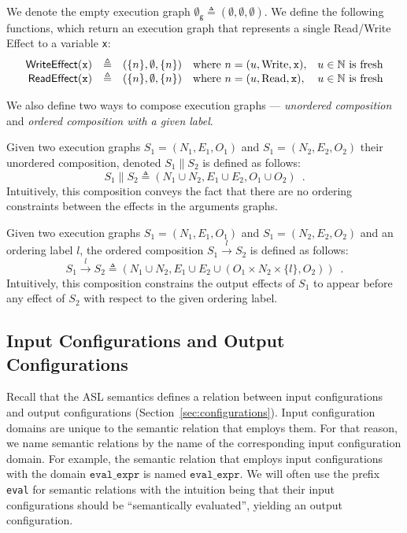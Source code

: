 \documentclass{book}
\newcommand\secref[1]{Section~\ref{sec:#1}}
\newcommand\xgraph[0]{\textsf{g}}
\newcommand\emptygraph[0]{{\emptyset}_\xgraph}
\newcommand\Read[0]{\text{Read}}
\newcommand\Write[0]{\text{Write}}
\newcommand\WriteEffect[0]{\textsf{WriteEffect}}
\newcommand\ReadEffect[0]{\textsf{ReadEffect}}
\newcommand\ordered[3]{{#1}\xrightarrow{#2}{#3}}
\begin{document}
We denote the empty execution graph $\emptygraph \triangleq (\emptyset, \emptyset, \emptyset)$.
%
We define the following functions, which return an execution graph that represents a single Read/Write Effect to a variable \texttt{x}:
\[
  \begin{array}{rclll}
    \WriteEffect(\vx) &\triangleq& (\{n\}, \emptyset, \{n\}) & \text{where } n=(u, \Write, \vx), & u\in\N \text{ is fresh}\\
    \ReadEffect(\vx)  &\triangleq& (\{n\}, \emptyset, \{n\}) & \text{where } n=(u, \Read, \vx),   & u\in\N \text{ is fresh}\\
  \end{array}
\]

We also define two ways to compose execution graphs --- \emph{unordered composition} and
\emph{ordered composition with a given label}.

Given two execution graphs $S_1 = (N_1, E_1, O_1)$ and $S_1 = (N_2, E_2, O_2)$ their unordered composition,
denoted $S_1 \parallel S_2$ is defined as follows:
\[
  S_1 \parallel S_2\triangleq (N_1 \cup N_2, E_1 \cup E_2, O_1 \cup O_2) \enspace.
\]
Intuitively, this composition conveys the fact that there are no ordering constraints between the effects
in the arguments graphs.

Given two execution graphs $S_1 = (N_1, E_1, O_1)$ and $S_1 = (N_2, E_2, O_2)$ and an ordering label $l$,
the ordered composition $\ordered{S_1}{l}{S_2}$ is defined as follows:
\[
  \ordered{S_1}{l}{S_2} \triangleq (N_1 \cup N_2, E_1 \cup E_2 \cup (O_1 \times N_2 \times \{l\}, O_2)) \enspace.
\]
Intuitively, this composition constrains the output effects of $S_1$ to appear before any effect of $S_2$ with respect
to the given ordering label.

\subsection{Input Configurations and Output Configurations \label{sec:InputAndOutputConfigurations}}

Recall that the ASL semantics defines a relation between input configurations and output configurations
(\secref{configurations}).
Input configuration domains are unique to the semantic relation that employs them.
For that reason, we name semantic relations by the name of the corresponding input configuration domain.
For example, the semantic relation that employs input configurations with the domain $\texttt{eval\_expr}$
is named $\texttt{eval\_expr}$.
%
We will often use the prefix \texttt{eval} for semantic relations with the intuition being that their input configurations
should be ``semantically evaluated'', yielding an output configuration.
\end{document}
